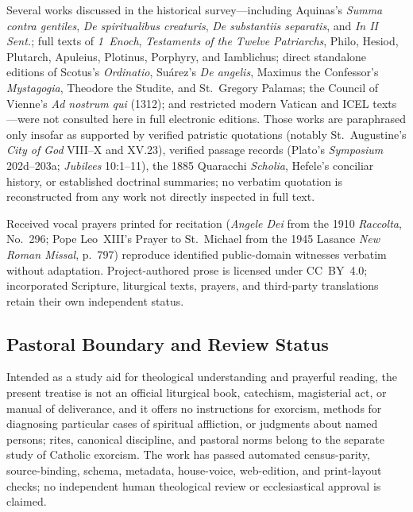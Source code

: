 Several works discussed in the historical survey---including Aquinas's \emph{Summa contra gentiles}, \emph{De spiritualibus creaturis}, \emph{De substantiis separatis}, and \emph{In II Sent.}; full texts of \emph{1~Enoch}, \emph{Testaments of the Twelve Patriarchs}, Philo, Hesiod, Plutarch, Apuleius, Plotinus, Porphyry, and Iamblichus; direct standalone editions of Scotus's \emph{Ordinatio}, Su\'arez's \emph{De angelis}, Maximus the Confessor's \emph{Mystagogia}, Theodore the Studite, and St.~Gregory Palamas; the Council of Vienne's \emph{Ad nostrum qui} (1312); and restricted modern Vatican and ICEL texts---were not consulted here in full electronic editions. Those works are paraphrased only insofar as supported by verified patristic quotations (notably St.~Augustine's \emph{City of God} VIII--X and XV.23), verified passage records (Plato's \emph{Symposium} 202d--203a; \emph{Jubilees} 10:1--11), the 1885 Quaracchi \emph{Scholia}, Hefele's conciliar history, or established doctrinal summaries; no verbatim quotation is reconstructed from any work not directly inspected in full text.

Received vocal prayers printed for recitation (\emph{Angele Dei} from the 1910 \emph{Raccolta}, No.~296; Pope Leo~XIII's Prayer to St.~Michael from the 1945 Lasance \emph{New Roman Missal}, p.~797) reproduce identified public-domain witnesses verbatim without adaptation. Project-authored prose is licensed under CC~BY~4.0; incorporated Scripture, liturgical texts, prayers, and third-party translations retain their own independent status.

\subsection{Pastoral Boundary and Review Status}

Intended as a study aid for theological understanding and prayerful reading, the present treatise is not an official liturgical book, catechism, magisterial act, or manual of deliverance, and it offers no instructions for exorcism, methods for diagnosing particular cases of spiritual affliction, or judgments about named persons; rites, canonical discipline, and pastoral norms belong to the separate study of Catholic exorcism. The work has passed automated census-parity, source-binding, schema, metadata, house-voice, web-edition, and print-layout checks; no independent human theological review or ecclesiastical approval is claimed.
